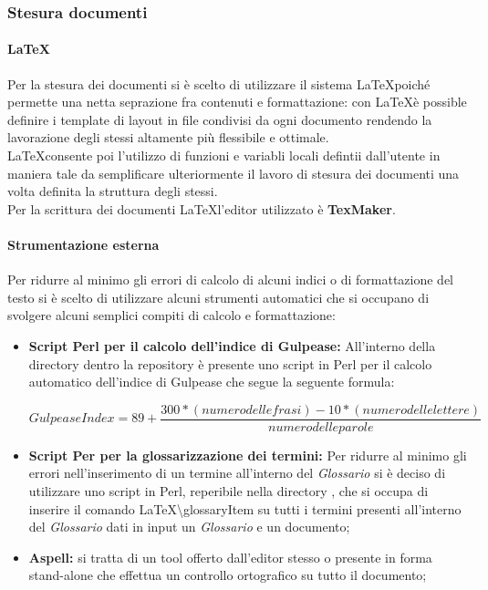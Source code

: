     \subsubsection{Stesura documenti}
      \paragraph{\LaTeX}
        Per la stesura dei documenti si è scelto di utilizzare il sistema \LaTeX poiché permette una netta seprazione fra contenuti
        e formattazione: con \LaTeX è possible definire i template di layout in file condivisi da ogni documento rendendo la lavorazione
        degli stessi altamente più flessibile e ottimale.\\
        \LaTeX consente poi l'utilizzo di funzioni e variabli locali defintii dall'utente in maniera tale da semplificare ulteriormente
        il lavoro di stesura dei documenti una volta definita la struttura degli stessi.\\
        Per la scrittura dei documenti \LaTeX l'editor utilizzato è \textbf{TexMaker}.
      \paragraph{Strumentazione esterna}
        Per ridurre al minimo gli errori di calcolo di alcuni indici o di formattazione del testo si è scelto di utilizzare alcuni strumenti
        automatici che si occupano di svolgere alcuni semplici compiti di calcolo e formattazione:
        \begin{itemize}
          \item \textbf{Script Perl per il calcolo dell'indice di Gulpease: }All'interno della directory  dentro la repository è presente
          uno script in Perl per il calcolo automatico dell'indice di Gulpease che segue la seguente formula:
          \begin{center}
            \begin{equation}
              Gulpease Index = 89+\frac{300*( numero delle frasi ) - 10*( numero delle lettere )}{numero delle parole}
            \end{equation}
          \end{center}
          \item \textbf{Script Per per la glossarizzazione dei termini: }Per ridurre al minimo gli errori nell'inserimento di un termine all'interno
          del \emph{Glossario} si è deciso di utilizzare uno script in Perl, reperibile nella directory , che si occupa di inserire
          il comando \LaTeX \textbackslash glossaryItem{} su tutti i termini presenti all'interno del \emph{Glossario} dati in input un \emph{Glossario}
          e un documento;
          \item \textbf{Aspell: }si tratta di un tool offerto dall'editor stesso o presente in forma stand-alone che effettua un controllo ortografico
          su tutto il documento;
        \end{itemize}
